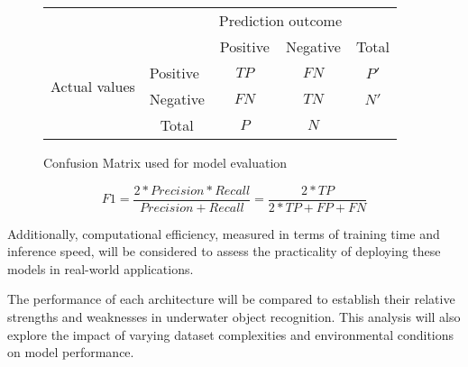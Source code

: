 \begin{figure}[ht]
    \begin{tabular}{l|l|c|c|c}
        \multicolumn{2}{c}{}&\multicolumn{2}{c}{Prediction outcome}&\\
        \cline{3-4}
        \multicolumn{2}{c|}{}&Positive&Negative&\multicolumn{1}{c}{Total}\\
        \cline{2-4}
        \multirow{2}{*}{Actual values}& Positive & $TP$ & $FN$ & $P'$\\
        \cline{2-4}
        & Negative & $FN$ & $TN$ & $N'$\\
        \cline{2-4}
        \multicolumn{1}{c}{} & \multicolumn{1}{c}{Total} & \multicolumn{1}{c}{$P$} & \multicolumn{    1}{c}{$N$} & \multicolumn{1}{c}{}\\
    \end{tabular}
    \caption{Confusion Matrix used for model evaluation}
    \label{Tab:confMatrix}
\end{figure}

\begin{equation}
    F1 = \frac{2*Precision*Recall}{Precision+Recall} = \frac{2*TP}{2*TP+FP+FN}
\end{equation}

Additionally, computational efficiency, measured in terms of training time
and inference speed, will be considered to assess the practicality
of deploying these models in real-world applications.

The performance of each architecture will be compared to establish
their relative strengths and weaknesses in underwater object recognition.
This analysis will also explore the impact of varying dataset complexities
and environmental conditions on model performance.

\FloatBarrier

